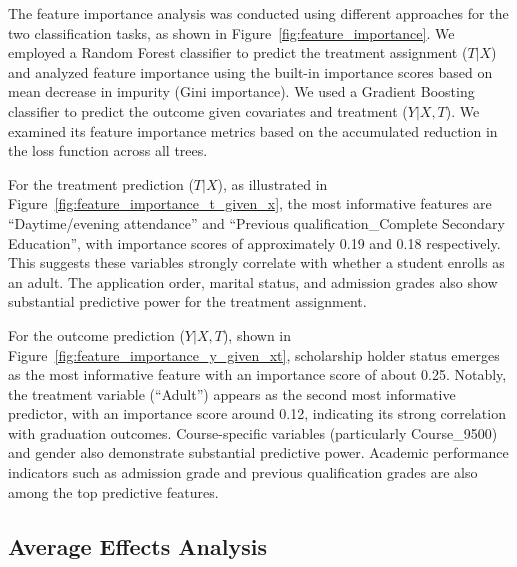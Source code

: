 \documentclass{article}
\begin{document}
The feature importance analysis was conducted using different approaches for the two classification tasks, as shown in Figure~\ref{fig:feature_importance}. We employed a Random Forest classifier to predict the treatment assignment ($T|X$) and analyzed feature importance using the built-in importance scores based on mean decrease in impurity (Gini importance). We used a Gradient Boosting classifier to predict the outcome given covariates and treatment ($Y|X,T$). We examined its feature importance metrics based on the accumulated reduction in the loss function across all trees.

For the treatment prediction ($T|X$), as illustrated in Figure~\ref{fig:feature_importance_t_given_x}, the most informative features are ``Daytime/evening attendance'' and ``Previous qualification\_Complete Secondary Education'', with importance scores of approximately 0.19 and 0.18 respectively. This suggests these variables strongly correlate with whether a student enrolls as an adult. The application order, marital status, and admission grades also show substantial predictive power for the treatment assignment.

For the outcome prediction ($Y|X,T$), shown in Figure~\ref{fig:feature_importance_y_given_xt}, scholarship holder status emerges as the most informative feature with an importance score of about 0.25. Notably, the treatment variable (``Adult'') appears as the second most informative predictor, with an importance score around 0.12, indicating its strong correlation with graduation outcomes. Course-specific variables (particularly Course\_9500) and gender also demonstrate substantial predictive power. Academic performance indicators such as admission grade and previous qualification grades are also among the top predictive features.

\subsection{Average Effects Analysis}
\end{document}
